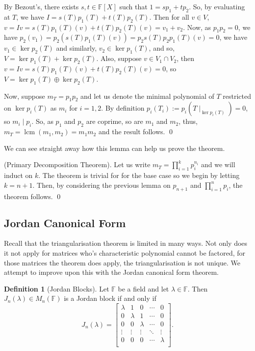 \documentclass[
]{article}
\theoremstyle{definition}
\newtheorem{definition}{Definition}[section]
\begin{document}
By Bezout's, there exists \(s, t \in \mathbb{F}[X]\) such that
\(1 = sp_1 + tp_2\). So, by evaluating at \(T\), we have
\(I = s(T)p_1(T) + t(T)p_2(T)\). Then for all \(v \in V\),
\(v = Iv = s(T)p_1(T)(v) + t(T)p_2(T)(v) = v_1 + v_2\). Now, as
\(p_1 p_2 = 0\), we have
\(p_2(v_1) = p_2(s(T)p_1(T)(v)) = p_2 s(T)p_2 p_1(T)(v) = 0\), we have
\(v_1 \in \ker p_2(T)\) and similarly, \(v_2 \in \ker p_1(T)\), and so,
\(V = \ker p_1(T) + \ker p_2(T)\). Also, suppose \(v \in V_1 \cap V_2\),
then \(v = Iv = s(T)p_1(T)(v) + t(T)p_2(T)(v) = 0\), so
\(V = \ker p_1(T) \oplus \ker p_2(T)\).

Now, suppose \(m_T = p_1 p_2\) and let us denote the minimal polynomial
of \(T\) restricted on \(\ker p_i(T)\) as \(m_i\) for \(i = 1, 2\). By
definition \(p_i(T_i) := p_i(T \mid_{\ker p_i(T)}) = 0\), so
\(m_i \mid p_i\). So, as \(p_1\) and \(p_2\) are coprime, so are \(m_1\)
and \(m_2\), thus, \(m_T = \mathop{\mathrm{lcm}}(m_1, m_2) = m_1 m_2\)
and the result follows. \qed

We can see straight away how this lemma can help us prove the theorem.

\proof (Primary Decomposition Theorem). Let us write
\(m_T = \prod_{i = 1}^k p_i^{n_i}\) and we will induct on \(k\). The
theorem is trivial for for the base case so we begin by letting
\(k = n + 1\). Then, by considering the previous lemma on \(p_{n + 1}\)
and \(\prod_{i = 1}^n p_i\), the theorem follows. \qed

\hypertarget{jordan-canonical-form}{%
\subsection{Jordan Canonical Form}\label{jordan-canonical-form}}

Recall that the triangularisation theorem is limited in many ways. Not
only does it not apply for matrices who's characteristic polynomial
cannot be factored, for those matrices the theorem does apply, the
triangularisation is not unique. We attempt to improve upon this with
the Jordan canonical form theorem.

\begin{definition}[Jordan Blocks]
  Let \(\mathbb{F}\) be a field and let \(\lambda \in \mathbb{F}\). Then 
  \(J_n(\lambda) \in M_n(\mathbb{F})\) is a Jordan block if and only if 
  \[J_n(\lambda) = \begin{bmatrix}
      \lambda & 1 & 0 & \cdots & 0\\
      0 & \lambda & 1 & \cdots & 0\\
      0 & 0 & \lambda & \cdots & 0\\
      \vdots & \vdots &  \vdots & \ddots & \vdots \\
      0 & 0 & 0 & \cdots & \lambda\\
    \end{bmatrix}.\]
\end{definition}
\end{document}
